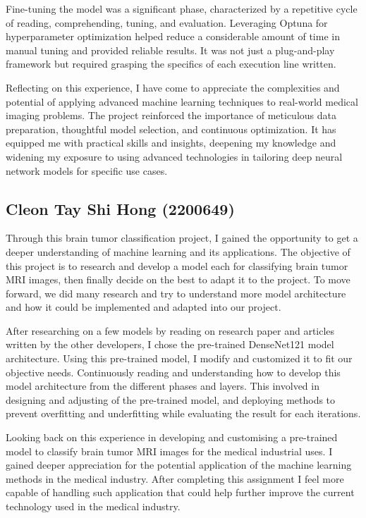 Fine-tuning the model was a significant phase, characterized by a repetitive cycle of reading, comprehending, tuning, and evaluation. Leveraging Optuna for hyperparameter optimization helped reduce a considerable amount of time in manual tuning and provided reliable results. It was not just a plug-and-play framework but required grasping the specifics of each execution line written.

Reflecting on this experience, I have come to appreciate the complexities and potential of applying advanced machine learning techniques to real-world medical imaging problems. The project reinforced the importance of meticulous data preparation, thoughtful model selection, and continuous optimization. It has equipped me with practical skills and insights, deepening my knowledge and widening my exposure to using advanced technologies in tailoring deep neural network models for specific use cases.

\subsection{Cleon Tay Shi Hong (2200649)}\label{ss:ctsh}

Through this brain tumor classification project, I gained the opportunity to get a deeper understanding of machine learning and its applications. The objective of this project is to research and develop a model each for classifying brain tumor MRI images, then finally decide on the best to adapt it to the project. To move forward, we did many research and try to understand more model architecture and how it could be implemented and adapted into our project.

After researching on a few models by reading on research paper and articles written by the other developers, I chose the pre-trained DenseNet121 model architecture. Using this pre-trained model, I modify and customized it to fit our objective needs. Continuously reading and understanding how to develop this model architecture from the different phases and layers. This involved in designing and adjusting of the pre-trained model, and deploying methods to prevent overfitting and underfitting while evaluating the result for each iterations.

Looking back on this experience in developing and customising a pre-trained model to classify brain tumor MRI images for the medical industrial uses. I gained deeper appreciation for the potential application of the machine learning methods in the medical industry. After completing this assignment I feel more capable of handling such application that could help further improve the current technology used in the medical industry.

